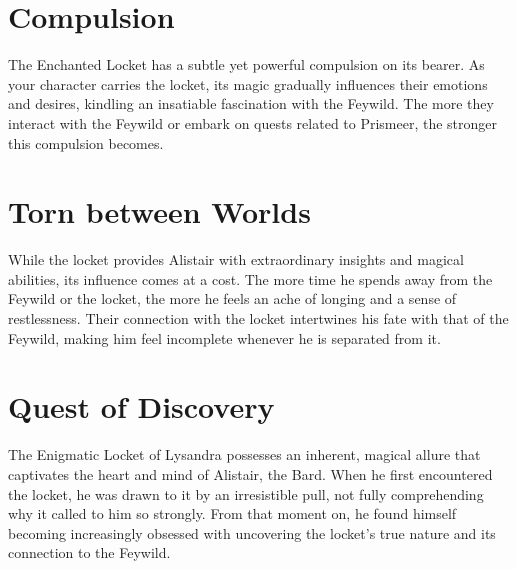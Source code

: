 \documentclass[letterpaper,openany,oneside,twocolumn]{book}
\begin{document}
\section*{Compulsion}
The Enchanted Locket has a subtle yet powerful compulsion on its bearer. As your character carries the locket, its magic gradually influences their emotions and desires, kindling an insatiable fascination with the Feywild. The more they interact with the Feywild or embark on quests related to Prismeer, the stronger this compulsion becomes.
\section*{Torn between Worlds}
While the locket provides Alistair with extraordinary insights and magical abilities, its influence comes at a cost. The more time he spends away from the Feywild or the locket, the more he feels an ache of longing and a sense of restlessness. Their connection with the locket intertwines his fate with that of the Feywild, making him feel incomplete whenever he is separated from it.
\section*{Quest of Discovery}
The Enigmatic Locket of Lysandra possesses an inherent, magical allure that captivates the heart and mind of Alistair, the Bard. When he first encountered the locket, he was drawn to it by an irresistible pull, not fully comprehending why it called to him so strongly. From that moment on, he found himself becoming increasingly obsessed with uncovering the locket's true nature and its connection to the Feywild.
\end{document}
